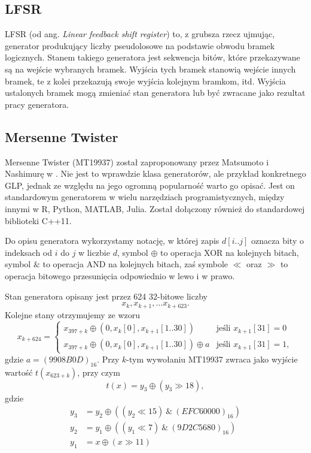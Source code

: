 \documentclass[a4paper,11pt,twoside]{book}
\theoremstyle{definition}
\begin{document}
\subsection*{LFSR}
LFSR (od ang. \textit{Linear feedback shift register}) to, z grubsza rzecz ujmując, generator produkujący liczby pseudolosowe na podstawie obwodu bramek logicznych. Stanem takiego generatora jest sekwencja bitów, które przekazywane są na wejście wybranych bramek. Wyjścia tych bramek stanowią wejście innych bramek, te z kolei przekazują swoje wyjścia kolejnym bramkom, itd. Wyjścia ustalonych bramek mogą zmieniać stan generatora lub być zwracane jako rezultat pracy generatora. 

\subsection*{Mersenne Twister}
Mersenne Twister (MT19937) został zaproponowany przez Matsumoto i Nashimurę w \cite{twister}. Nie jest to wprawdzie klasa generatorów, ale przykład konkretnego GLP, jednak ze względu na jego ogromną popularność warto go opisać. Jest on standardowym generatorem w wielu narzędziach programistycznych, między innymi w R, Python, MATLAB, Julia. Został dołączony również do standardowej biblioteki C++11.

Do opisu generatora wykorzystamy notację, w której zapis $d[i..j]$ oznacza bity o indeksach od $i$ do $j$ w liczbie $d$, symbol $\oplus$ to operacja XOR na kolejnych bitach, symbol $\&$ to operacja AND na kolejnych bitach, zaś symbole $\ll$ oraz $\gg$ to operacja bitowego przesunięcia odpowiednio w lewo i w prawo.

Stan generatora opisany jest przez 624 32-bitowe liczby
\[ x_k, x_{k+1}, \ldots x_{k+623}. \]
Kolejne stany otrzymujemy ze wzoru
\[ x_{k+624} = \begin{cases}
      x_{397+k}\oplus (0, x_k[0], x_{k+1}[1..30]) &\mbox{jeśli } x_{k+1}[31] = 0 \\ 
      x_{397+k}\oplus (0, x_k[0], x_{k+1}[1..30]) \oplus a & \mbox{jeśli } x_{k+1}[31] = 1,
    \end{cases} \]
gdzie $a = (9908B0D)_{16}$. Przy $k$-tym wywołaniu MT19937 zwraca jako wyjście wartość $t(x_{623+k})$, przy czym
\[ t(x) = y_3 \oplus (y_3 \gg 18), \]
gdzie
\begin{equation*} 
\begin{split}
 y_3 &= y_2 \oplus ((y_2 \ll 15)\ \&\ (EFC60000)_{16})\\
 y_2 &= y_1 \oplus ((y_1 \ll 7)\ \&\ (9D2C5680)_{16})\\
 y_1 &= x \oplus (x \gg 11)
\end{split}
\end{equation*}
\end{document}
